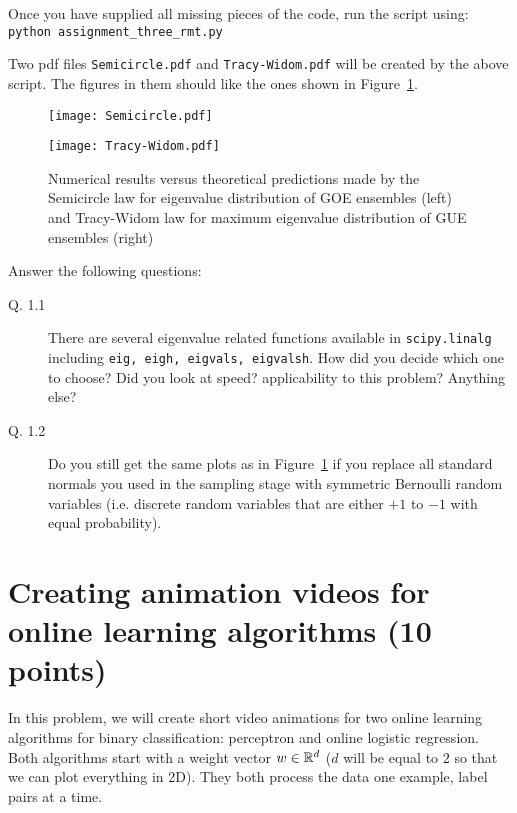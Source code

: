 \documentclass{article}
\begin{document}
Once you have supplied all missing pieces of the code, run the script using:\\
{\tt python assignment\_three\_rmt.py}

Two pdf files \verb#Semicircle.pdf# and \verb#Tracy-Widom.pdf# will be created by the above script. The figures in them should like the ones
shown in Figure~\ref{rmt}.

\begin{figure}
\begin{minipage}{.4\textwidth}
\texttt{[image: Semicircle.pdf]}
\end{minipage}
\hspace{.1\textwidth}
\begin{minipage}{.4\textwidth}
\texttt{[image: Tracy-Widom.pdf]}
\end{minipage}
\caption{Numerical results versus theoretical predictions made by the Semicircle law for eigenvalue distribution of GOE ensembles (left) and Tracy-Widom law for
maximum eigenvalue distribution of GUE ensembles (right)}
\label{rmt}
\end{figure}

Answer the following questions:
\begin{description}
\item[Q. 1.1]
There are several eigenvalue related functions available in \verb#scipy.linalg# including {\tt eig, eigh, eigvals, eigvalsh}. How did you decide which one to choose?
Did you look at speed? applicability to this problem? Anything else?
\item[Q. 1.2]
Do you still get the same plots as in Figure~\ref{rmt} if you replace all standard normals you used in the sampling stage with symmetric Bernoulli random variables (i.e.
discrete random variables that are either $+1$ to $-1$ with equal probability).

\end{description}

\section{Creating animation videos for online learning algorithms (10 points)}

In this problem, we will create short video animations for two online learning algorithms for
binary classification: perceptron and online logistic regression.
Both algorithms start with a weight vector $w \in \mathbb{R}^d$ ($d$ will be equal to $2$ so that we can plot everything in 2D).
They both process the data one example, label pairs at a time.
\end{document}
